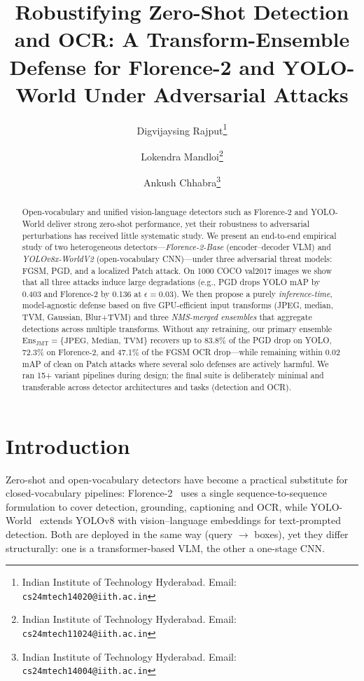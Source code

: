 \documentclass[10pt,twocolumn,letterpaper]{article}
\begin{document}
\title{Robustifying Zero-Shot Detection and OCR: A Transform-Ensemble Defense for Florence-2 and YOLO-World Under Adversarial Attacks}

\author{Digvijaysing Rajput\thanks{Indian Institute of Technology Hyderabad. Email: \texttt{cs24mtech14020@iith.ac.in}} \and
Lokendra Mandloi\thanks{Indian Institute of Technology Hyderabad. Email: \texttt{cs24mtech11024@iith.ac.in}} \and
Ankush Chhabra\thanks{Indian Institute of Technology Hyderabad. Email: \texttt{cs24mtech14004@iith.ac.in}}
}

\maketitle
\thispagestyle{empty}

\begin{abstract}
Open-vocabulary and unified vision-language detectors such as Florence-2 and YOLO-World deliver strong zero-shot performance, yet their robustness to adversarial perturbations has received little systematic study. We present an end-to-end empirical study of two heterogeneous detectors---\emph{Florence-2-Base} (encoder--decoder VLM) and \emph{YOLOv8x-WorldV2} (open-vocabulary CNN)---under three adversarial threat models: FGSM, PGD, and a localized Patch attack. On 1000 COCO val2017 images we show that all three attacks induce large degradations (e.g., PGD drops YOLO mAP by 0.403 and Florence-2 by 0.136 at $\epsilon{=}0.03$). We then propose a purely \emph{inference-time}, model-agnostic defense based on five GPU-efficient input transforms (JPEG, median, TVM, Gaussian, Blur+TVM) and three \emph{NMS-merged ensembles} that aggregate detections across multiple transforms. Without any retraining, our primary ensemble $\mathrm{Ens}_{\text{JMT}}{=}\{\text{JPEG, Median, TVM}\}$ recovers up to 83.8\% of the PGD drop on YOLO, 72.3\% on Florence-2, and 47.1\% of the FGSM OCR drop---while remaining within 0.02 mAP of clean on Patch attacks where several solo defenses are actively harmful. We ran 15+ variant pipelines during design; the final suite is deliberately minimal and transferable across detector architectures and tasks (detection and OCR).
\end{abstract}

\section{Introduction}
\label{sec:intro}
Zero-shot and open-vocabulary detectors have become a practical substitute for closed-vocabulary pipelines: Florence-2~\cite{xiao2024florence2} uses a single sequence-to-sequence formulation to cover detection, grounding, captioning and OCR, while YOLO-World~\cite{cheng2024yoloworld} extends YOLOv8 with vision--language embeddings for text-prompted detection. Both are deployed in the same way (query $\rightarrow$ boxes), yet they differ structurally: one is a transformer-based VLM, the other a one-stage CNN.
\end{document}
